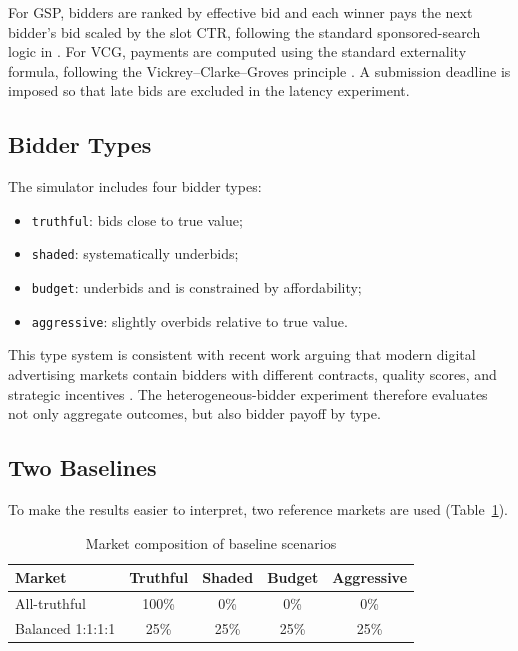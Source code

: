\documentclass[12pt,a4paper]{article}
\begin{document}
For GSP, bidders are ranked by effective bid and each winner pays the next bidder's bid scaled by the slot CTR, following the standard sponsored-search logic in \cite{edelman2007,varian2007}. For VCG, payments are computed using the standard externality formula, following the Vickrey--Clarke--Groves principle \cite{vickrey1961,clarke1971,groves1973}. A submission deadline is imposed so that late bids are excluded in the latency experiment.

\subsection{Bidder Types}

The simulator includes four bidder types:
\begin{itemize}
  \item \texttt{truthful}: bids close to true value;
  \item \texttt{shaded}: systematically underbids;
  \item \texttt{budget}: underbids and is constrained by affordability;
  \item \texttt{aggressive}: slightly overbids relative to true value.
\end{itemize}

This type system is consistent with recent work arguing that modern digital advertising markets contain bidders with different contracts, quality scores, and strategic incentives \cite{ghoshal2023,xu2023,kim2025}. The heterogeneous-bidder experiment therefore evaluates not only aggregate outcomes, but also bidder payoff by type.

\subsection{Two Baselines}

To make the results easier to interpret, two reference markets are used (Table~\ref{tab:baseline_comp}).

\begin{table}[t]
  \centering
  \caption{Market composition of baseline scenarios}
  \label{tab:baseline_comp}
  \small
  \begin{tabular}{lcccc}
    \toprule
    Market & Truthful & Shaded & Budget & Aggressive \\
    \midrule
    All-truthful & 100\% & 0\% & 0\% & 0\% \\
    Balanced 1:1:1:1 & 25\% & 25\% & 25\% & 25\% \\
    \bottomrule
  \end{tabular}
\end{table}
\end{document}
